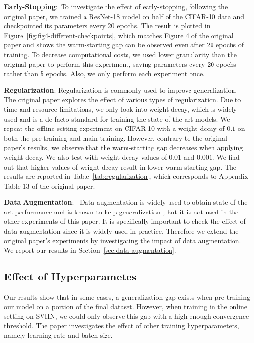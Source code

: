 \textbf{Early-Stopping}:~To investigate the effect of early-stopping, following the original paper, we trained a ResNet-18 model on half of the CIFAR-10 data and checkpointed its parameters every 20 epochs. The result is plotted in Figure~\ref{fig:fig4-different-checkpoints}, which matches Figure 4 of the original paper and shows the warm-starting gap can be observed even after 20 epochs of training. To decrease computational costs, we used lower granularity than the original paper to perform this experiment, saving parameters every 20 epochs rather than 5 epochs. Also, we only perform each experiment once. 


\textbf{Regularization}: Regularization is commonly used to improve generalization. The original paper explores the effect of various types of regularization. Due to time and resource limitations, we only look into weight decay, which is widely used and is a de-facto standard for training the state-of-the-art models. We repeat the offline setting experiment on CIFAR-10 with a weight decay of $0.1$ on both the pre-training and main training. However, contrary to the original paper's results, we observe that the warm-starting gap decreases when applying weight decay. We also test with weight decay values of $0.01$ and $0.001$. We find out that higher values of weight decay result in lower warm-starting gap. The results are reported in Table~\ref{tab:regularization}, which corresponds to Appendix Table 13 of the original paper.


\textbf{Data Augmentation}:~ Data augmentation is widely used to obtain state-of-the-art performance and is known to help generalization \cite{shorten2019survey}, but it is not used in the other experiments of this paper. It is specifically important to check the effect of data augmentation since it is widely used in practice. Therefore we extend the original paper's experiments by investigating the impact of data augmentation. We report our results in Section~\ref{sec:data-augmentation}.

\subsection{Effect of Hyperparametes}

Our results show that in some cases, a generalization gap exists when pre-training our model on a portion of the final dataset. However, when training in the online setting on SVHN, we could only observe this gap with a high enough convergence threshold. The paper investigates the effect of other training hyperparameters, namely learning rate and batch size.

